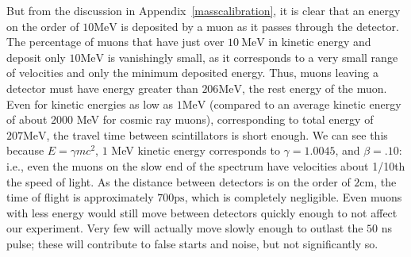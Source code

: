 But from the discussion in Appendix~\ref{masscalibration}, it is clear that an energy on the order of $10 \mathrm{MeV}$ is deposited by a muon as it passes through the detector. The percentage of muons that have just over $10~\mathrm{MeV}$ in kinetic energy and deposit only $10 \mathrm{MeV}$ is vanishingly small, as it corresponds to a very small range of velocities and only the minimum deposited energy. Thus, muons leaving a detector must have energy greater than $206 \mathrm{MeV}$, the rest energy of the muon. Even for kinetic energies as low as $1 \mathrm{MeV}$ (compared to an average kinetic energy of about $2000$ MeV for cosmic ray muons), corresponding to total energy of $207 \mathrm{MeV}$, the travel time between scintillators is short enough. We can see this because $E = \gamma mc^2$, $1$ MeV kinetic energy corresponds to $\gamma = 1.0045$, and $\beta = .10$: i.e., even the muons on the slow end of the spectrum have velocities about 1/10th the speed of light. As the distance between detectors is on the order of $2 \mathrm{cm}$, the time of flight is approximately $700 \mathrm{ps}$, which is completely negligible. Even muons with less energy would still move between detectors quickly enough to not affect our experiment. Very few will actually move slowly enough to outlast the $50$ ns pulse; these will contribute to false starts and noise, but not significantly so. 